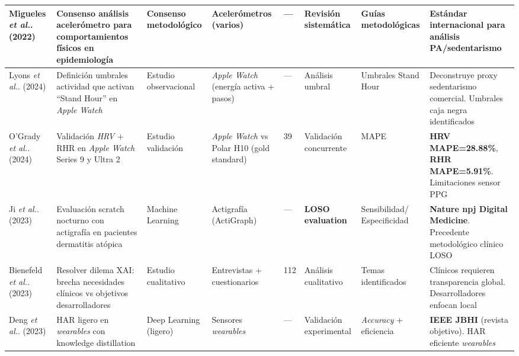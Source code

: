 \begin{landscape}
\begin{longtable}{@{}p{1.8cm}p{2.5cm}p{1.8cm}p{1.5cm}p{0.9cm}p{1.3cm}p{2.0cm}p{1.8cm}@{}}
\midrule

Migueles \textit{et al.}. (2022) \cite{Migueles2022GRANADA} & 
Consenso análisis acelerómetro para comportamientos físicos en epidemiología & 
Consenso metodológico & 
Acelerómetros (varios) & 
--- & 
Revisión sistemática & 
Guías metodológicas & 
Estándar internacional para análisis PA/sedentarismo \\

\midrule


Lyons \textit{et al.}. (2024) \cite{Lyons2024StandHour} & 
Definición umbrales actividad que activan ``Stand Hour'' en \textit{Apple Watch} & 
Estudio observacional & 
\textit{Apple Watch} (energía activa + pasos) & 
--- & 
Análisis umbral & 
Umbrales Stand Hour & 
Deconstruye proxy sedentarismo comercial. Umbrales caja negra identificados \\

\midrule

O'Grady \textit{et al.}. (2024) \cite{OGrady2024AppleWatch} & 
Validación \textit{HRV} + RHR en \textit{Apple Watch} Series 9 y Ultra 2 & 
Estudio validación & 
\textit{Apple Watch} vs Polar H10 (gold standard) & 
39 & 
Validación concurrente & 
MAPE & 
\textbf{HRV MAPE=28.88\%}, \textbf{RHR MAPE=5.91\%}. Limitaciones sensor PPG \\

\midrule

Ji \textit{et al.}. (2023) \cite{Ji2023Scratch} & 
Evaluación scratch nocturno con actigrafía en pacientes dermatitis atópica & 
Machine Learning & 
Actigrafía (ActiGraph) & 
--- & 
\textbf{LOSO evaluation} & 
Sensibilidad/ Especificidad & 
\textbf{Nature npj Digital Medicine}. Precedente metodológico clínico LOSO \\

\midrule


Bienefeld \textit{et al.}. (2023) \cite{Bienefeld2023XAI} & 
Resolver dilema XAI: brecha necesidades clínicos vs objetivos desarrolladores & 
Estudio cualitativo & 
Entrevistas + cuestionarios & 
112 & 
Análisis cualitativo & 
Temas identificados & 
Clínicos requieren transparencia global. Desarrolladores enfocan local \\

\midrule

Deng \textit{et al.}. (2023) \cite{Deng2023LharJBHI} & 
HAR ligero en \textit{wearables} con knowledge distillation & 
Deep Learning (ligero) & 
Sensores \textit{wearables} & 
--- & 
Validación experimental & 
\textit{Accuracy} + eficiencia & 
\textbf{IEEE JBHI} (revista objetivo). HAR eficiente \textit{wearables} \\


\end{longtable}
\end{landscape}
